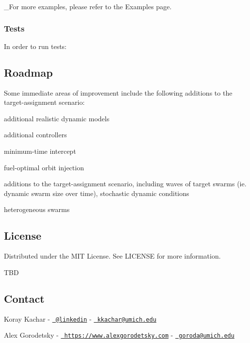 \+\_\+\+For more examples, please refer to the Examples page.

\subsubsection*{Tests}

In order to run tests\+:


\begin{DoxyCode}{0}
\end{DoxyCode}


\subsection*{Roadmap}

Some immediate areas of improvement include the following additions to the target-\/assignment scenario\+:
\begin{DoxyItemize}
\item additional realistic dynamic models
\item additional controllers
\begin{DoxyItemize}
\item minimum-\/time intercept
\item fuel-\/optimal orbit injection
\end{DoxyItemize}
\item additions to the target-\/assignment scenario, including waves of target swarms (ie. dynamic swarm size over time), stochastic dynamic conditions
\item heterogeneous swarms
\end{DoxyItemize}

\subsection*{License}

Distributed under the M\+IT License. See {\ttfamily L\+I\+C\+E\+N\+SE} for more information.

T\+BD

\subsection*{Contact}


\begin{DoxyItemize}
\item Koray Kachar -\/ \href{https://www.linkedin.com/in/koray-kachar/}{\texttt{ @linkedin}} -\/ \href{mailto:kkachar@umich.edu}{\texttt{ kkachar@umich.\+edu}}
\item Alex Gorodetsky -\/ \href{https://www.alexgorodetsky.com}{\texttt{ https\+://www.\+alexgorodetsky.\+com}} -\/ \href{mailto:goroda@umich.edu}{\texttt{ goroda@umich.\+edu}}
\end{DoxyItemize}

